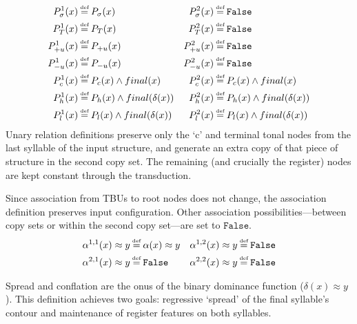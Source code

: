 \documentclass{article}
\newcommand\myeq{\mathrel{\stackrel{\makebox[0pt]{\mbox{\normalfont\tiny def}}}{=}}}
\newcommand{\ap}{\approx}
\begin{document}
\begin{equation}
\begin{aligned}
P_{\sigma}^{1}(x)&\myeq P_{\sigma}(x) & P_{\sigma}^{2}(x)&\myeq \mathtt{False} \\
P_{T}^{1}(x)&\myeq P_{T}(x) & P_{T}^{2}(x)&\myeq \mathtt{False}  \\
P_{+u}^{1}(x)&\myeq P_{+u}(x) & P_{+u}^{2}(x)&\myeq \mathtt{False} \\
P_{-u}^{1}(x)&\myeq P_{-u}(x) & P_{-u}^{2}(x)&\myeq \mathtt{False}  \\
P_{c}^{1}(x)&\myeq P_{c}(x) \land final(x) & P_{c}^{2}(x)&\myeq P_{c}(x)\land final(x) \\
P_{h}^{1}(x)&\myeq P_{h}(x) \land final(\delta(x)) & P_{h}^{2}(x)&\myeq P_{h}(x)\land final(\delta(x)) \\
P_{l}^{1}(x)&\myeq P_{l}(x) \land final(\delta(x)) & P_{l}^{2}(x)&\myeq P_{l}(x)\land final(\delta(x)) \\
\end{aligned}
\end{equation}
Unary relation definitions preserve only the `c' and terminal tonal nodes from the last syllable of the input structure, and generate an extra copy of that piece of structure in the second copy set. The remaining (and crucially the register) nodes are kept constant through the transduction. \par
Since association from TBUs to root nodes does not change, the association definition preserves input configuration. Other association possibilities---between copy sets or within the second copy set---are set to $\mathtt{False}$.
\begin{equation}
\begin{aligned}
\alpha^{1,1}(x)\ap y&\myeq\alpha(x)\ap y & \alpha^{1,2}(x)\ap y&\myeq\mathtt{False} \\
\alpha^{2,1}(x)\ap y&\myeq\mathtt{False} & \alpha^{2,2}(x)\ap y&\myeq\mathtt{False} \\
\end{aligned}
\end{equation} \par
Spread and conflation are the onus of the binary dominance function ($\delta(x)\ap y$). This definition achieves two goals: regressive `spread' of the final syllable's contour and maintenance of register features on both syllables.
\end{document}
